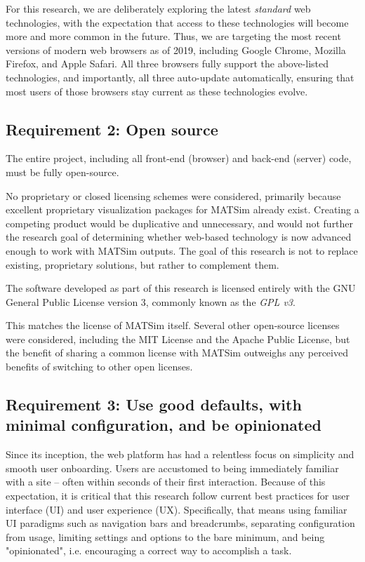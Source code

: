 \documentclass[Afour,sagev,times]{sagej}
\begin{document}
For this research, we are deliberately exploring the latest \textit{standard} web technologies, with the expectation that access to these technologies will become more and more common in the future. Thus, we are targeting the most recent versions of modern web browsers as of 2019, including Google Chrome, Mozilla Firefox,
and Apple Safari. All three browsers fully support the above-listed technologies, and importantly, all three auto-update automatically, ensuring that most users of those browsers stay current as these technologies evolve.

\subsection{Requirement 2: Open source}

The entire project, including all front-end (browser) and back-end (server) code, must be fully open-source.

No proprietary or closed licensing schemes were considered, primarily because excellent proprietary visualization packages for MATSim already exist. Creating a competing product would be duplicative and unnecessary, and would not further the research goal of determining whether web-based technology is now advanced enough to work with MATSim outputs. The goal of this research is not to replace existing, proprietary solutions, but rather to complement them.

The software developed as part of this research is licensed entirely with the GNU General Public License version 3, commonly known as the \textit{GPL v3}\cite{R4}.

This matches the license of MATSim itself. Several other open-source licenses were considered, including the MIT License and the Apache Public License, but the benefit of sharing a common license with MATSim outweighs any perceived benefits of switching to other open licenses.

\subsection{Requirement 3: Use good defaults, with minimal configuration, and be opinionated}

Since its inception, the web platform has had a relentless focus on simplicity and smooth user onboarding. Users are accustomed to being immediately familiar with a site -- often within seconds of their first interaction. Because of this expectation, it is critical that this research follow current best practices
for user interface (UI) and user experience (UX). Specifically, that means using familiar UI paradigms such as navigation bars and breadcrumbs, separating configuration from usage, limiting settings and options to the bare minimum, and being "opinionated", i.e. encouraging a correct way to accomplish a task.
\end{document}

